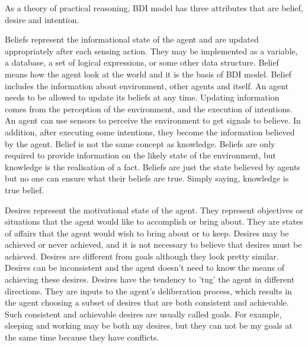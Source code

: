 As a theory of practical reasoning, BDI model has three attributes that are belief, desire and intention.

Beliefs represent the informational state of the agent and are updated appropriately after each sensing action. They may be implemented as a variable, a database, a set of logical expressions, or some other data structure\cite{Rao_BDITheory_1995}. Belief means how the agent look at the world and it is the basis of BDI model. Belief includes the information about environment, other agents and itself. An agent needs to be allowed to update its beliefs at any time. Updating information comes from the perception of the environment, and the execution of intentions. An agent can use sensors to perceive the environment to get signals to believe. In addition, after executing some intentions, they become the information believed by the agent. Belief is not the same concept as knowledge. Beliefs are only required to provide information on the likely state of the environment, but knowledge is the realisation of a fact. Beliefs are just the state believed by agents but no one can ensure what their beliefs are true. Simply saying, knowledge is true belief.

Desires represent the motivational state of the agent\cite{Rao_BDITheory_1995}. They represent objectives or situations that the agent would like to accomplish or bring about. They are states of affairs that the agent would wish to bring about or to keep. Desires may be achieved or never achieved, and it is not necessary to believe that desires must be achieved. Desires are different from goals although they look pretty similar. Desires can be inconsistent and the agent doesn't need to know the means of achieving these desires. Desires have the tendency to 'tug' the agent in different directions. They are inputs to the agent's deliberation process, which results in the agent choosing a subset of desires that are both consistent and achievable. Such consistent and achievable desires are usually called goals\cite{Gerhard_MultiSystem_1999}. For example, sleeping and working may be both my desires, but they can not be my goals at the same time because they have conflicts.

